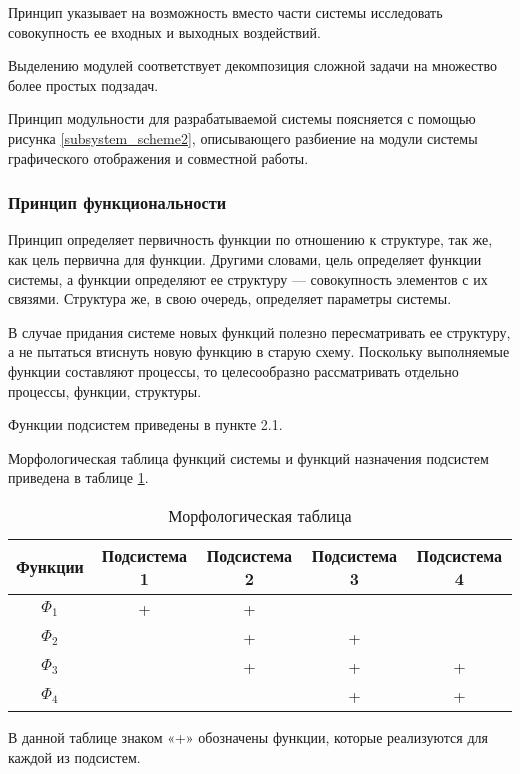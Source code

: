 Принцип указывает на возможность вместо части системы исследовать совокупность ее входных и выходных воздействий.

Выделению модулей соответствует декомпозиция сложной задачи на множество более простых подзадач.

Принцип модульности для разрабатываемой системы поясняется с помощью рисунка \ref{subsystem_scheme2}, описывающего разбиение на модули системы графического отображения и совместной работы.


\subsubsection{Принцип функциональности}
Принцип определяет первичность функции по отношению к структуре, так же, как цель первична для функции. 
Другими словами, цель определяет функции системы, а функции определяют ее структуру — совокупность элементов с их связями. 
Структура же, в свою очередь, определяет параметры системы. 

В случае придания системе новых функций полезно пересматривать ее структуру, а не пытаться втиснуть новую функцию в старую схему. 
Поскольку выполняемые функции составляют процессы, то целесообразно рассматривать отдельно процессы, функции, структуры.

Функции подсистем приведены в пункте 2.1.

Морфологическая таблица функций системы и функций назначения подсистем приведена в таблице \ref{table:morphological}.

\begin{table}[H]
    \centering
    \caption{Морфологическая таблица}\label{table:morphological}
    \begin{tabular}{|c|c|c|c|c|}
    \hline Функции & Подсистема 1 & Подсистема 2 & Подсистема 3 & Подсистема 4 \\
    \hline $\Phi_1$ & + & + &   &  \\
    \hline $\Phi_2$ &  & + & + &  \\
    \hline $\Phi_3$ &  & + & + & + \\
    \hline $\Phi_4$ &  &  & + & + \\
    \hline
    \end{tabular}
\end{table}

В данной таблице знаком «+» обозначены функции, которые реализуются для каждой из подсистем.

